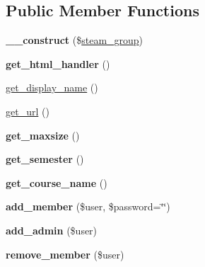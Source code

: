 \subsection*{Public Member Functions}
\begin{DoxyCompactItemize}
\item 
\hypertarget{classkoala__group__course_a663a235df139d4a1923a6a54a4457837}{
{\bfseries \_\-\_\-construct} (\$\hyperlink{classsteam__group}{steam\_\-group})}
\label{classkoala__group__course_a663a235df139d4a1923a6a54a4457837}

\item 
\hypertarget{classkoala__group__course_ae549b56023e5aa0060bf8560ddca1c10}{
{\bfseries get\_\-html\_\-handler} ()}
\label{classkoala__group__course_ae549b56023e5aa0060bf8560ddca1c10}

\item 
\hyperlink{classkoala__group__course_ae7f78fa9fedb4439229c69024f3f546f}{get\_\-display\_\-name} ()
\item 
\hyperlink{classkoala__group__course_abef906ab34967aad6d0b7f308056bad3}{get\_\-url} ()
\item 
\hypertarget{classkoala__group__course_ad73cd596320be176b7187df5dcfdb3ff}{
{\bfseries get\_\-maxsize} ()}
\label{classkoala__group__course_ad73cd596320be176b7187df5dcfdb3ff}

\item 
\hypertarget{classkoala__group__course_a9683d5541b1714b3ad6eca0c987c26c1}{
{\bfseries get\_\-semester} ()}
\label{classkoala__group__course_a9683d5541b1714b3ad6eca0c987c26c1}

\item 
\hypertarget{classkoala__group__course_ae9b77002c3511f23e361d76ea1b54296}{
{\bfseries get\_\-course\_\-name} ()}
\label{classkoala__group__course_ae9b77002c3511f23e361d76ea1b54296}

\item 
\hypertarget{classkoala__group__course_ac5bcb5dcbbc9505e7bcaa27e55e00011}{
{\bfseries add\_\-member} (\$user, \$password=\char`\"{}\char`\"{})}
\label{classkoala__group__course_ac5bcb5dcbbc9505e7bcaa27e55e00011}

\item 
\hypertarget{classkoala__group__course_a49d9ce66da3bb0a3f0c47e1c160d675e}{
{\bfseries add\_\-admin} (\$user)}
\label{classkoala__group__course_a49d9ce66da3bb0a3f0c47e1c160d675e}

\item 
\hypertarget{classkoala__group__course_a0539e59cf0695adae0fd6b8b6305b1b7}{
{\bfseries remove\_\-member} (\$user)}
\label{classkoala__group__course_a0539e59cf0695adae0fd6b8b6305b1b7}


\end{DoxyCompactItemize}
